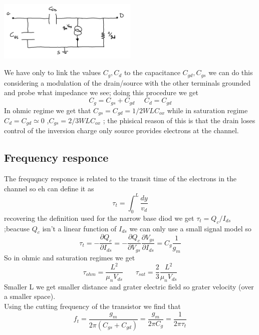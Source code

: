 \centering
\includegraphics[width=0.5\textwidth]{smallsig.png}\\
\raggedright

We have only to link the values $C_g,C_d$ to the capacitance $C_{gd},C_{gs}$ we can do this considering a modulation of the drain/source with the other terminals grounded and probe what impedance we see; doing this procedure we get 
\begin{equation}
C_g=C_{gs}+C_{gd} \ \ \ \ \ \ C_d=C_{gd}
\end{equation}
In ohmic regime we get that $C_{gs}=C_{gd}=1/2WLC_{ox}$ while in saturation regime $C_d=C_{gd}\simeq 0$ ,$C_{gs}=2/3WLC_{ox}$ ; the phisical reason of this is that the drain loses control of the inversion charge only source provides electrons at the channel.\\

\subsection{Frequency responce} 
The frequqncy responce is related to the transit time of the electrons in the channel so eh can define it as 
\begin{equation}
\tau_t=\int_0^L \frac{dy}{v_d}
\end{equation}
recovering the definition used for the narrow base diod we get $\tau_t=Q_c/I_{ds}$ ;beacuse $Q_c$ isn't a linear function of $I_{ds}$ we can only use a small signal model so
\begin{equation}
\tau_t= -\frac{\partial Q_c}{\partial I_{ds}}= -\frac{\partial Q_c}{\partial V_{gs}}\frac{\partial V_{gs}}{\partial I_{ds}}=C_g \frac{1}{g_m}
\end{equation}
So in ohmic and saturation regimes we get
\begin{equation}
\tau_{ohm}=\frac{L^2}{\mu_nV_{ds}}\ \ \ \ \ \ \ \ \tau_{sat}=\frac{2}{3} \frac{L^2}{\mu_nV_{ds}}
\end{equation}
Smaller L we get smaller distance and grater electric field so grater velocity (over a smaller space).\\
Using the cutting frequency of the transistor we find that 
\begin{equation}
f_t=\frac{g_m}{2\pi (C_{gs}+C_{gd})}=\frac{g_m}{2\pi C_g}=\frac{1}{2\pi \tau_t}
\end{equation}

